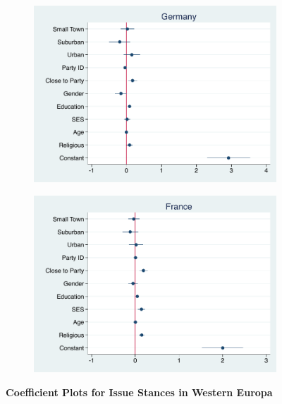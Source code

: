 \documentclass[12pt, titlepage]{article}
\newcommand\tb{\textbf}
\begin{document}
\begin{figure}[H]
	\centering
	\begin{subfigure}[b]{0.475\textwidth}
		\centering
		\includegraphics[width=\textwidth]{LibCoef/Germany}
	\end{subfigure}
	\hfill
	\begin{subfigure}[b]{0.475\textwidth}  
		\centering 
		\includegraphics[width=\textwidth]{LibCoef/France}
	\end{subfigure}
	\caption[ \tb{Issue Stances - Western Europe} ]
	{\tb {Coefficient Plots for Issue Stances in Western Europa} }
	\label{WestEuroLib}
\end{figure}
\end{document}
